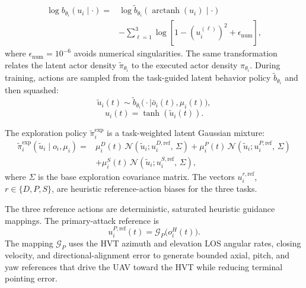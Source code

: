 \documentclass{cja}
\begin{document}
\begin{equation}
\begin{aligned}
\log b_{\theta_i}(u_i\mid\cdot)
= {}&
\log
\widetilde b_{\theta_i}
\left(
\operatorname{arctanh}(u_i)\mid\cdot
\right)
\\
&-
\sum_{\ell=1}^{3}
\log
\left[
1-\left(u_i^{(\ell)}\right)^2+\epsilon_{\mathrm{num}}
\right],
\end{aligned}
\end{equation}
where $\epsilon_{\mathrm{num}}=10^{-6}$ avoids numerical singularities. The same transformation relates the latent actor density $\widetilde\pi_{\theta_i}$ to the executed actor density $\pi_{\theta_i}$. During training, actions are sampled from the task-guided latent behavior policy $\widetilde b_{\theta_i}$ and then squashed:
\begin{equation}
\widetilde u_i(t)
\sim
\widetilde b_{\theta_i}
\bigl(\cdot\mid\bar o_i(t),\mu_i(t)\bigr),
\end{equation}
\begin{equation}
u_i(t)
=
\tanh\!\left(\widetilde u_i(t)\right).
\end{equation}

The exploration policy $\widetilde\pi_i^{\mathrm{exp}}$ is a task-weighted latent Gaussian mixture:
\begin{equation}
\begin{aligned}
\widetilde\pi_i^{\mathrm{exp}}(\widetilde u_i\mid o_i,\mu_i)
={}&
\mu_i^D(t)\,\mathcal{N}\!\left(\widetilde u_i;u_i^{D,\mathrm{ref}},\,\Sigma\right)
+
\mu_i^P(t)\,\mathcal{N}\!\left(\widetilde u_i;u_i^{P,\mathrm{ref}},\,\Sigma\right)\\
&+
\mu_i^S(t)\,\mathcal{N}\!\left(\widetilde u_i;u_i^{S,\mathrm{ref}},\,\Sigma\right),
\end{aligned}
\end{equation}
where $\Sigma$ is the base exploration covariance matrix. The vectors $u_i^{r,\mathrm{ref}}$, $r\in\{D,P,S\}$, are heuristic reference-action biases for the three tasks.

The three reference actions are deterministic, saturated heuristic guidance mappings. The primary-attack reference is
\begin{equation}
u_i^{P,\mathrm{ref}}(t)
=\mathcal G_P\bigl(o_i^H(t)\bigr).
\end{equation}
The mapping $\mathcal G_P$ uses the HVT azimuth and elevation LOS angular rates, closing velocity, and directional-alignment error to generate bounded axial, pitch, and yaw references that drive the UAV toward the HVT while reducing terminal pointing error.
\end{document}
